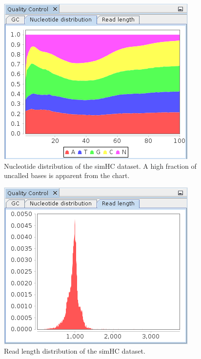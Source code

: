 \begin{figure}[H]
\centering
\includegraphics[width=.6\textwidth]{img/mgx/QCnuc}
\caption[Quality control]{Nucleotide distribution of the simHC dataset. A high fraction of uncalled bases
is apparent from the chart.}
\label{qc2}
\end{figure}

\begin{figure}[H]
\centering
\includegraphics[width=.6\textwidth]{img/mgx/QCreadlen}
\caption[Quality control]{Read length distribution of the simHC dataset. }
\label{qc3}
\end{figure}

